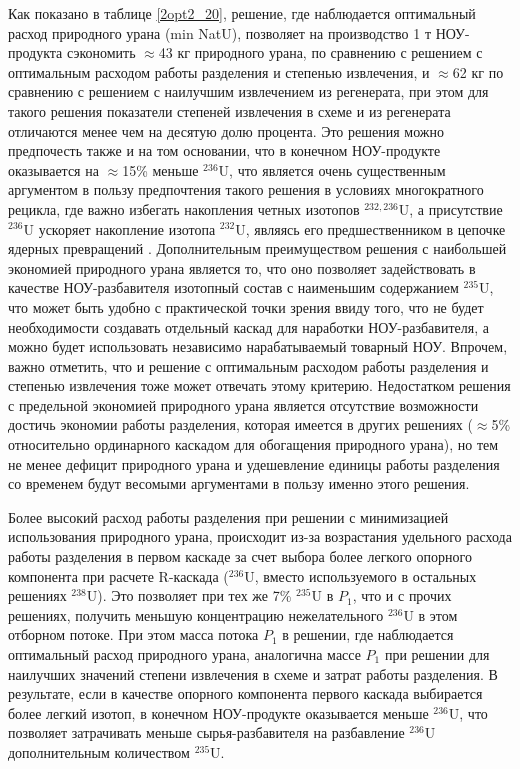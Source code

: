 Как показано в таблице \ref{2opt2_20}, решение, где наблюдается оптимальный расход природного урана (min NatU), позволяет на производство 1 т НОУ-продукта сэкономить $\approx$43 кг природного урана, по сравнению с решением с оптимальным расходом работы разделения и степенью извлечения, и $\approx$62 кг по сравнению с решением с наилучшим извлечением из регенерата, при этом для такого решения показатели степеней извлечения в схеме и из регенерата отличаются менее чем на десятую долю процента. Это решения можно предпочесть также и на том основании, что в конечном НОУ-продукте оказывается на $\approx$15\% меньше $^{236}$U, что является очень существенным аргументом в пользу предпочтения такого решения в условиях многократного рецикла, где важно избегать накопления четных изотопов $^{232,236}$U, а присутствие $^{236}$U ускоряет накопление изотопа $^{232}$U, являясь его предшественником в цепочке ядерных превращений \cite{smirnovEvolutionIsotopicComposition2012}. Дополнительным преимуществом решения с наибольшей экономией природного урана является то, что оно позволяет задействовать в качестве НОУ-разбавителя изотопный состав с наименьшим содержанием $^{235}$U, что может быть удобно с практической точки зрения ввиду того, что не будет необходимости создавать отдельный каскад для наработки НОУ-разбавителя, а можно будет использовать независимо нарабатываемый товарный НОУ. Впрочем, важно отметить, что и решение с оптимальным расходом работы разделения и степенью извлечения тоже может отвечать этому критерию. Недостатком решения с предельной экономией природного урана является отсутствие возможности достичь экономии работы разделения, которая имеется в других решениях ($\approx$5\% относительно ординарного каскадом для обогащения природного урана), но тем не менее дефицит природного урана и удешевление единицы работы разделения со временем будут весомыми аргументами в пользу именно этого решения.

Более высокий расход работы разделения при решении с минимизацией использования природного урана, происходит из-за возрастания удельного расхода работы разделения в первом каскаде за счет выбора более легкого опорного компонента при расчете R-каскада ($^{236}$U, вместо используемого в остальных решениях $^{238}$U). Это позволяет при тех же 7\% $^{235}$U в $P_{1}$, что и с прочих решениях, получить меньшую концентрацию нежелательного $^{236}$U в этом отборном потоке. При этом масса потока $P_{1}$ в решении, где наблюдается оптимальный расход природного урана, аналогична массе $P_{1}$ при решении для наилучших значений степени извлечения в схеме и затрат работы разделения. В результате, если в качестве опорного компонента первого каскада выбирается более легкий изотоп, в конечном НОУ-продукте оказывается меньше $^{236}$U, что позволяет затрачивать меньше сырья-разбавителя на разбавление $^{236}$U дополнительным количеством $^{235}$U.

